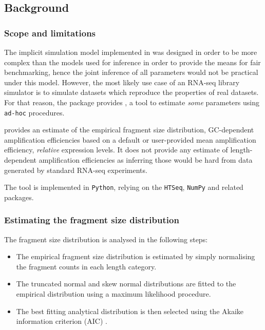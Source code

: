 \subsection{Background}


\subsubsection{Scope and limitations}

The implicit simulation model implemented in \rlsim was designed in order to be more complex than the models used for inference
in order to provide the means for fair benchmarking, hence the joint inference of all parameters would not be practical under this model.
However, the most likely use case of an RNA-seq library simulator is to simulate datasets which reproduce the properties of real datasets. For that reason, the \rlsim package provides \effest, a tool to estimate \emph{some} parameters using \texttt{ad-hoc} procedures.

\effest provides an estimate of the empirical fragment size distribution, GC-dependent amplification efficiencies based on a default or user-provided mean amplification efficiency, \emph{relative} expression levels. It does not provide any estimate of length-dependent amplification efficiencies as inferring those would be hard from data generated by standard RNA-seq experiments.


The \effest tool is implemented in \texttt{Python}, relying on the \texttt{HTSeq}, \texttt{NumPy} and related packages.

\subsubsection{Estimating the fragment size distribution}

The fragment size distribution is analysed in the following steps:
\begin{itemize}
    \item The empirical fragment size distribution is estimated by simply normalising the fragment counts in each length category.
    \item The truncated normal and skew normal distributions are fitted to the empirical distribution using a maximum likelihood procedure.
    \item The best fitting analytical distribution is then selected using the Akaike information criterion (AIC) \cite{aic}.
\end{itemize}

